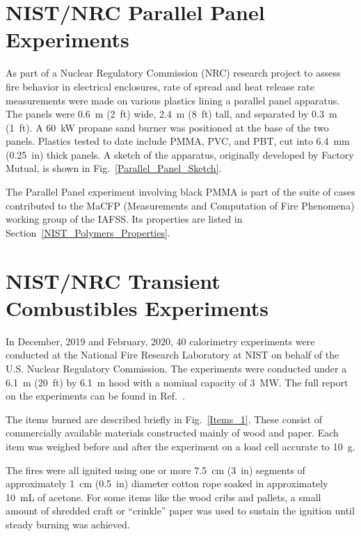 \FloatBarrier

\section{NIST/NRC Parallel Panel Experiments}
\label{NIST_NRC_Parallel_Panels_Description}

As part of a Nuclear Regulatory Commission (NRC) research project to assess fire behavior in electrical enclosures, rate of spread and heat release rate measurements were made on various plastics lining a parallel panel apparatus. The panels were 0.6~m (2~ft) wide, 2.4~m (8~ft) tall, and separated by 0.3~m (1~ft). A 60~kW propane sand burner was positioned at the base of the two panels. Plastics tested to date include PMMA, PVC, and PBT, cut into 6.4~mm (0.25~in) thick panels. A sketch of the apparatus, originally developed by Factory Mutual, is shown in Fig.~\ref{Parallel_Panel_Sketch}.

The Parallel Panel experiment involving black PMMA is part of the suite of cases contributed to the MaCFP (Measurements and Computation of Fire Phenomena) working group of the IAFSS. Its properties are listed in Section~\ref{NIST_Polymers_Properties}.

\section{NIST/NRC Transient Combustibles Experiments}
\label{NIST_NRC_Transient_Combustibles_Description}

In December, 2019 and February, 2020, 40 calorimetry experiments were conducted at the National Fire Research Laboratory at NIST on behalf of the U.S. Nuclear Regulatory Commission. The experiments were conducted under a 6.1~m (20~ft) by 6.1~m hood with a nominal capacity of 3~MW. The full report on the experiments can be found in Ref.~\cite{McGrattan:Multiple_Transients_2020}.

The items burned are described briefly in Fig.~\ref{Items_1}. These consist of commercially available materials constructed mainly of wood and paper. Each item was weighed before and after the experiment on a load cell accurate to 10~g.

The fires were all ignited using one or more 7.5~cm (3~in) segments of approximately 1~cm (0.5~in) diameter cotton rope soaked in approximately 10~mL of acetone. For some items like the wood cribs and pallets, a small amount of shredded craft or ``crinkle'' paper was used to sustain the ignition until steady burning was achieved.


